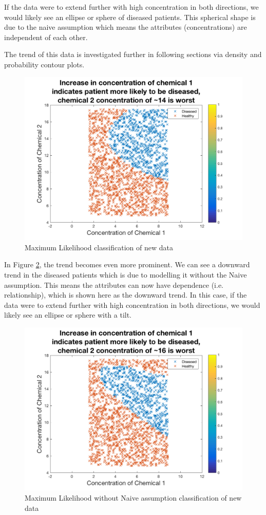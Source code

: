 { If the data were to extend further with high concentration in both directions, we would likely see an ellipse or sphere of diseased patients. This spherical shape is due to the naive assumption which means the attributes (concentrations) are independent of each other.
 
 The trend of this data is investigated further in following sections via density and probability contour plots.
 
\begin{figure}[h]
	\centering
	\includegraphics[width=0.8\linewidth]{images/MLnewData}
	\caption{Maximum Likelihood classification of new data}
	\label{fig:ML}
\end{figure}

In Figure \ref{fig:MLWON}, the trend becomes even more prominent. We can see a downward trend in the diseased patients which is due to modelling it without the Naive assumption. This means the attributes can now have dependence (i.e. relationship), which is shown here as the downward trend.  In this case, if the data were to extend further with high concentration in both directions, we would likely see an ellipse or sphere with a tilt.

\begin{figure}[h]
	\centering
	\includegraphics[width=0.8\linewidth]{images/MLWONnewData}
	\caption{Maximum Likelihood without Naive assumption classification of new data}
	\label{fig:MLWON}
\end{figure}

}
